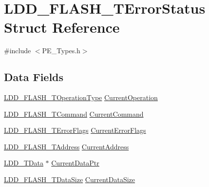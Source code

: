 \hypertarget{struct_l_d_d___f_l_a_s_h___t_error_status}{}\section{L\+D\+D\+\_\+\+F\+L\+A\+S\+H\+\_\+\+T\+Error\+Status Struct Reference}
\label{struct_l_d_d___f_l_a_s_h___t_error_status}


{\ttfamily \#include $<$P\+E\+\_\+\+Types.\+h$>$}

\subsection*{Data Fields}
\begin{DoxyCompactItemize}
\item 
\hyperlink{group___p_e___types__module_ga59054b7863240b77bde12e8762d3da5a}{L\+D\+D\+\_\+\+F\+L\+A\+S\+H\+\_\+\+T\+Operation\+Type} \hyperlink{struct_l_d_d___f_l_a_s_h___t_error_status_aa1b99bfba14fdc8379522df15da47e7b}{Current\+Operation}
\item 
\hyperlink{group___p_e___types__module_gac01cb076a7d214b9644c76681280e031}{L\+D\+D\+\_\+\+F\+L\+A\+S\+H\+\_\+\+T\+Command} \hyperlink{struct_l_d_d___f_l_a_s_h___t_error_status_a8121cb2540ba191287d219e4f1a675dd}{Current\+Command}
\item 
\hyperlink{group___p_e___types__module_ga0ca2b410992c2399635c62a94ab9dba5}{L\+D\+D\+\_\+\+F\+L\+A\+S\+H\+\_\+\+T\+Error\+Flags} \hyperlink{struct_l_d_d___f_l_a_s_h___t_error_status_a1f8e3f3fd6ceb25960d234254aee7e13}{Current\+Error\+Flags}
\item 
\hyperlink{group___p_e___types__module_gac67b6067e2a5242a8ffaf0d6dcee92c6}{L\+D\+D\+\_\+\+F\+L\+A\+S\+H\+\_\+\+T\+Address} \hyperlink{struct_l_d_d___f_l_a_s_h___t_error_status_aede15779720f091b04e8fb4b423dc654}{Current\+Address}
\item 
\hyperlink{group___p_e___types__module_gade8ef9401405bd941b6da738b807f980}{L\+D\+D\+\_\+\+T\+Data} $\ast$ \hyperlink{struct_l_d_d___f_l_a_s_h___t_error_status_a2c071a468d63d1572589e327dfe46fd4}{Current\+Data\+Ptr}
\item 
\hyperlink{group___p_e___types__module_ga070ee4b9c033934c6e33bc20fc18afc5}{L\+D\+D\+\_\+\+F\+L\+A\+S\+H\+\_\+\+T\+Data\+Size} \hyperlink{struct_l_d_d___f_l_a_s_h___t_error_status_ab7c77ef770367308c125aa95c4f0e465}{Current\+Data\+Size}
\end{DoxyCompactItemize}


